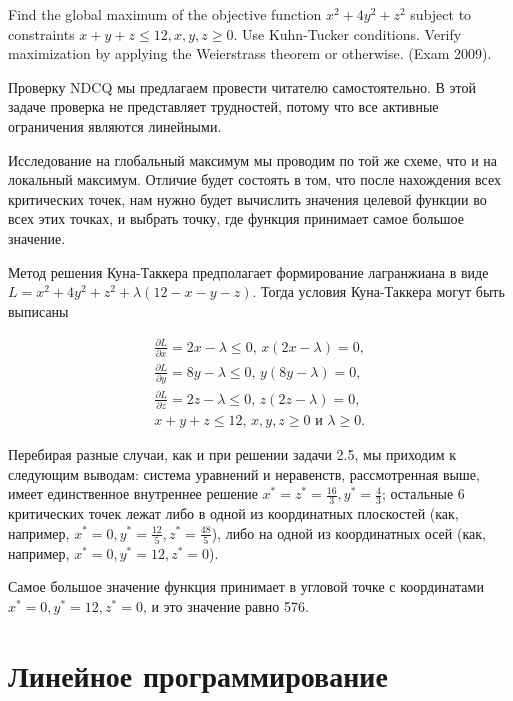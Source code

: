\begin{problem}
Find the global maximum of the objective function $x^{2} +4y^{2} +z^{2} $ subject to constraints $x+y+z\le 12, x,y,z\ge 0$. Use Kuhn-Tucker conditions. Verify maximization by applying the Weierstrass theorem or otherwise. (Exam 2009).


\begin{sol}

Проверку NDCQ мы предлагаем провести читателю самостоятельно. В этой задаче проверка не представляет трудностей, потому что все активные ограничения являются линейными.


Исследование на глобальный максимум мы проводим по той же схеме, что и на локальный максимум. Отличие будет состоять в том, что после нахождения всех критических точек, нам нужно будет вычислить значения целевой функции во всех этих точках, и выбрать точку, где функция принимает самое большое значение.

Метод решения Куна-Таккера предполагает формирование лагранжиана в виде $L=x^{2} +4y^{2} +z^{2} +\lambda (12-x-y-z)$. Тогда условия Куна-Таккера могут быть выписаны

\begin{align*}
\frac{\partial L}{\partial x} =2x-\lambda \le 0, \, x(2x-\lambda )=0, \\
\frac{\partial L}{\partial y} =8y-\lambda \le 0, \, y(8y-\lambda )=0, \\
\frac{\partial L}{\partial z} =2z-\lambda \le 0, \, z(2z-\lambda )=0,  \\
x+y+z\le 12, \, x,y,z\ge 0 \text{ и } \lambda \ge 0.
\end{align*}

Перебирая разные случаи, как и при решении задачи 2.5, мы приходим к следующим выводам: система уравнений и неравенств, рассмотренная выше, имеет единственное внутреннее решение $x^*=z^*=\frac{16}{3} , y^*=\frac{4}{3} $; остальные 6 критических точек лежат либо в одной из координатных плоскостей (как, например, $x^*=0, y^*=\frac{12}{5} , z^*=\frac{48}{5} $), либо на одной из координатных осей (как, например, $x^*=0, y^*=12, z^*=0$).

Самое большое значение функция принимает в угловой точке с координатами $x^*=0, y^*=12, z^*=0$, и это значение равно 576.
\end{sol}
\end{problem}



\section{Линейное программирование}

